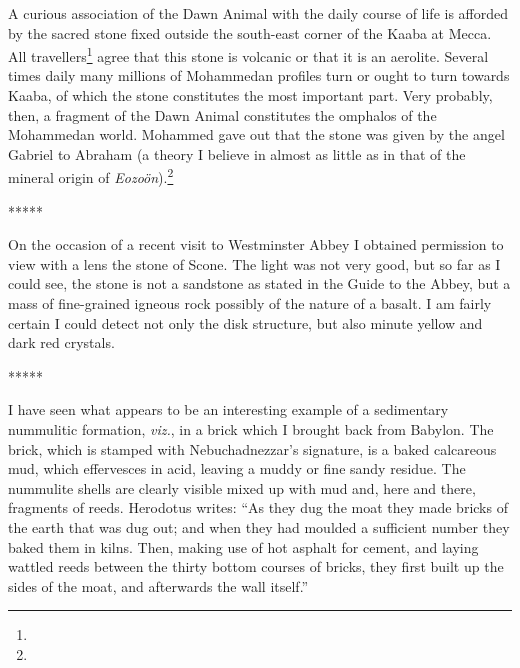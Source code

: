 \documentclass[a4paper, 12pt, oneside]{article}
\begin{document}
A curious association of the Dawn Animal with the daily course of life is afforded by the sacred stone fixed outside the south-east corner of the Kaaba at Mecca. All travellers\footnote{} agree that this stone is volcanic or that it is an aerolite. Several times daily many millions of Mohammedan profiles turn or ought to turn towards Kaaba, of which the stone constitutes the most important part. Very probably, then, a fragment of the Dawn Animal constitutes the omphalos of the Mohammedan world. Mohammed gave out that the stone was given by the angel Gabriel to Abraham (a theory I believe in almost as little as in that of the mineral origin of \emph{Eozoön}).\footnote{}

\centerline{*\hspace{15mm}*\hspace{15mm}*\hspace{15mm}*\hspace{15mm}*}
\bigskip

On the occasion of a recent visit to Westminster Abbey I obtained permission to view with a lens the stone of Scone. The light was not very good, but so far as I could see, the stone is not a sandstone as stated in the Guide to the Abbey, but a mass of fine-grained igneous rock possibly of the nature of a basalt. I am fairly certain I could detect not only the disk structure, but also minute yellow and dark red crystals.

\centerline{*\hspace{15mm}*\hspace{15mm}*\hspace{15mm}*\hspace{15mm}*}
\bigskip

I have seen what appears to be an interesting example of a sedimentary nummulitic formation, \emph{viz.}, in a brick which I brought back from Babylon. The brick, which is stamped with Nebuchadnezzar's signature, is a baked calcareous mud, which effervesces in acid, leaving a muddy or fine sandy residue. The nummulite shells are clearly visible mixed up with mud and, here and there, fragments of reeds. Herodotus writes: ``As they dug the moat they made bricks of the earth that was dug out; and when they had moulded a sufficient number they baked them in kilns. Then, making use of hot asphalt for cement, and laying wattled reeds between the thirty bottom courses of bricks, they first built up the sides of the moat, and afterwards the wall itself.''
\end{document}
